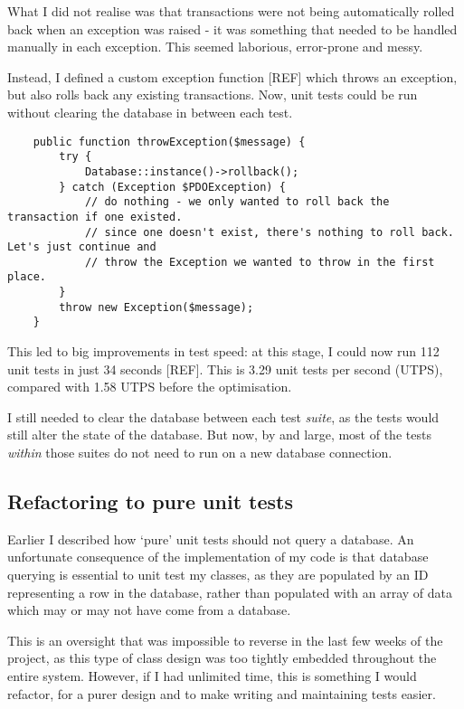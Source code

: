 What I did not realise was that transactions were not being automatically rolled back when an exception was raised - it was something that needed to be handled manually in each exception. This seemed laborious, error-prone and messy.

Instead, I defined a custom exception function [REF] which throws an exception, but also rolls back any existing transactions. Now, unit tests could be run without clearing the database in between each test. %

\begin{lstlisting}
    public function throwException($message) {
        try {
            Database::instance()->rollback();
        } catch (Exception $PDOException) {
            // do nothing - we only wanted to roll back the transaction if one existed.
            // since one doesn't exist, there's nothing to roll back. Let's just continue and
            // throw the Exception we wanted to throw in the first place.
        }
        throw new Exception($message);
    }
\end{lstlisting}

This led to big improvements in test speed: at this stage, I could now run 112 unit tests in just 34 seconds [REF]. This is 3.29 unit tests per second (UTPS), compared with 1.58 UTPS before the optimisation. %

I still needed to clear the database between each test \emph{suite}, as the tests would still alter the state of the database. But now, by and large, most of the tests \emph{within} those suites do not need to run on a new database connection.

\subsection{Refactoring to pure unit tests}

Earlier I described how `pure' unit tests should not query a database. An unfortunate consequence of the implementation of my code is that database querying is essential to unit test my classes, as they are populated by an ID representing a row in the database, rather than populated with an array of data which may or may not have come from a database.

This is an oversight that was impossible to reverse in the last few weeks of the project, as this type of class design was too tightly embedded throughout the entire system. However, if I had unlimited time, this is something I would refactor, for a purer design and to make writing and maintaining tests easier.

